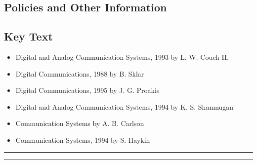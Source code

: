 
\subsection*{Policies and Other Information}
\subsection*{Key Text}

\begin{itemize}
    \item Digital and Analog Communication Systems, 1993 by L. W. Couch II.
    \item Digital Communications, 1988 by B. Sklar
    \item Digital Communications, 1995 by J. G. Proakis
    \item Digital and Analog Communication Systems, 1994 by K. S. Shanmugan
    \item Communication Systems by A. B. Carlson
    \item Communication Systems, 1994 by S. Haykin
\end{itemize}
\vspace{2ex}\hrule
\vspace{2ex}\hrule\vspace{2ex}